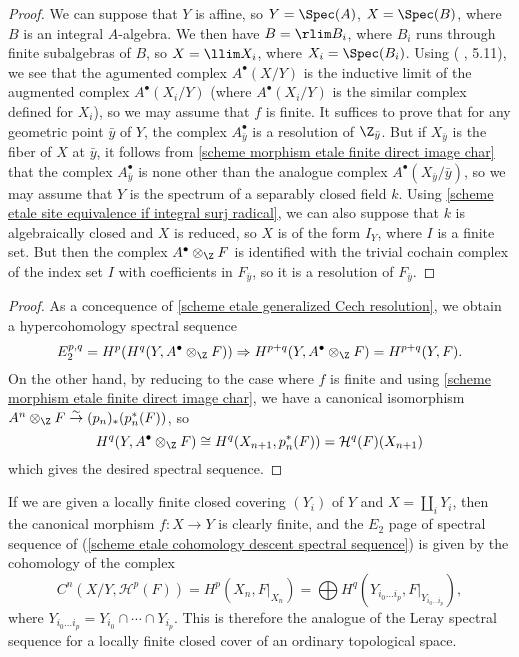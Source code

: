 \begin{proof}
We can suppose that $Y$ is affine, so $Y=\Spec(A)$, $X=\Spec(B)$, where $B$ is an integral $A$-algebra. We then have $B=\rlim B_i$, where $B_i$ runs through finite subalgebras of $B$, so $X=\llim X_i$, where $X_i=\Spec(B_i)$. Using (\cite{SGA4-2} , 5.11), we see that the agumented complex $A^\bullet(X/Y)$ is the inductive limit of the augmented complex $A^\bullet(X_i/Y)$ (where $A^\bullet(X_i/Y)$ is the similar complex defined for $X_i$), so we may assume that $f$ is finite. It suffices to prove that for any geometric point $\bar{y}$ of $Y$, the complex $A_{\bar{y}}^\bullet$ is a resolution of $\Z_{\bar{y}}$. But if $X_{\bar{y}}$ is the fiber of $X$ at $\bar{y}$, it follows from \cref{scheme morphism etale finite direct image char} that the complex $A^\bullet_{\bar{y}}$ is none other than the analogue complex $A^\bullet(X_{\bar{y}}/\bar{y})$, so we may assume that $Y$ is the spectrum of a separably closed field $k$. Using \cref{scheme etale site equivalence if integral surj radical}, we can also suppose that $k$ is algebraically closed and $X$ is reduced, so $X$ is of the form $I_Y$, where $I$ is a finite set. But then the complex $A^\bullet\otimes_\Z F$ is identified with the trivial cochain complex of the index set $I$ with coefficients in $F_{\bar{y}}$, so it is a resolution of $F_{\bar{y}}$.
\end{proof}
\begin{proof}
As a concequence of \cref{scheme etale generalized Cech resolution}, we obtain a hypercohomology spectral sequence
\[E_2^{p,q}=H^p(H^q(Y,A^\bullet\otimes_{\Z}F))\Rightarrow H^{p+q}(Y,A^\bullet\otimes_{\Z}F)=H^{p+q}(Y,F).\]
On the other hand, by reducing to the case where $f$ is finite and using \cref{scheme morphism etale finite direct image char}, we have a canonical isomorphism $A^n\otimes_{\Z}F\stackrel{\sim}{\to} (p_n)_*(p_n^*(F))$, so
\[H^q(Y,A^\bullet\otimes_{\Z}F)\cong H^q(X_{n+1},p_n^*(F))=\mathcal{H}^q(F)(X_{n+1})\]
which gives the desired spectral sequence.
\end{proof}

\begin{remark}
If we are given a locally finite closed covering $(Y_i)$ of $Y$ and $X=\coprod_iY_i$, then the canonical morphism $f:X\to Y$ is clearly finite, and the $E_2$ page of spectral sequence of (\ref{scheme etale cohomology descent spectral sequence}) is given by the cohomology of the complex
\[C^n(X/Y,\mathcal{H}^p(F))=H^p(X_n,F|_{X_n})=\bigoplus H^q(Y_{i_0\dots i_p},F|_{Y_{i_0\dots i_p}}),\]
where $Y_{i_0\dots i_p}=Y_{i_0}\cap\cdots\cap Y_{i_p}$. This is therefore the analogue of the Leray spectral sequence for a locally finite closed cover of an ordinary topological space.
\end{remark}


